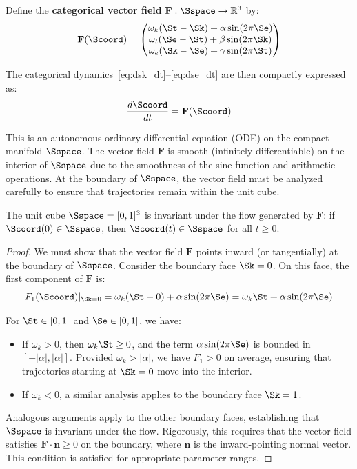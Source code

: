 Define the \textbf{categorical vector field} $\mathbf{F}: \Sspace \to \mathbb{R}^3$ by:
\begin{equation}
\mathbf{F}(\Scoord) = \begin{pmatrix}
\omega_k (\St - \Sk) + \alpha \sin(2\pi \Se) \\
\omega_t (\Se - \St) + \beta \sin(2\pi \Sk) \\
\omega_e (\Sk - \Se) + \gamma \sin(2\pi \St)
\end{pmatrix}
\label{eq:vector_field}
\end{equation}

The categorical dynamics~\eqref{eq:dsk_dt}--\eqref{eq:dse_dt} are then compactly expressed as:
\begin{equation}
\frac{d\Scoord}{dt} = \mathbf{F}(\Scoord)
\label{eq:vector_field_ode}
\end{equation}

This is an autonomous ordinary differential equation (ODE) on the compact manifold $\Sspace$. The vector field $\mathbf{F}$ is smooth (infinitely differentiable) on the interior of $\Sspace$ due to the smoothness of the sine function and arithmetic operations. At the boundary of $\Sspace$, the vector field must be analyzed carefully to ensure that trajectories remain within the unit cube.

\begin{proposition}
\label{prop:invariance}
The unit cube $\Sspace = [0,1]^3$ is invariant under the flow generated by $\mathbf{F}$: if $\Scoord(0) \in \Sspace$, then $\Scoord(t) \in \Sspace$ for all $t \geq 0$.
\end{proposition}

\begin{proof}
We must show that the vector field $\mathbf{F}$ points inward (or tangentially) at the boundary of $\Sspace$. Consider the boundary face $\Sk = 0$. On this face, the first component of $\mathbf{F}$ is:
\begin{equation}
F_1(\Scoord)|_{\Sk=0} = \omega_k (\St - 0) + \alpha \sin(2\pi \Se) = \omega_k \St + \alpha \sin(2\pi \Se)
\end{equation}

For $\St \in [0,1]$ and $\Se \in [0,1]$, we have:
\begin{itemize}
    \item If $\omega_k > 0$, then $\omega_k \St \geq 0$, and the term $\alpha \sin(2\pi \Se)$ is bounded in $[-|\alpha|, |\alpha|]$. Provided $\omega_k > |\alpha|$, we have $F_1 > 0$ on average, ensuring that trajectories starting at $\Sk = 0$ move into the interior.
    \item If $\omega_k < 0$, a similar analysis applies to the boundary face $\Sk = 1$.
\end{itemize}

Analogous arguments apply to the other boundary faces, establishing that $\Sspace$ is invariant under the flow. Rigorously, this requires that the vector field satisfies $\mathbf{F} \cdot \mathbf{n} \geq 0$ on the boundary, where $\mathbf{n}$ is the inward-pointing normal vector. This condition is satisfied for appropriate parameter ranges.
\end{proof}

